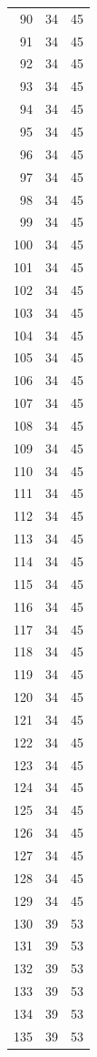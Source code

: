 \begin{table}
\begin{tabular}{rrr}
90 & 34 & 45 \\
91 & 34 & 45 \\
92 & 34 & 45 \\
93 & 34 & 45 \\
94 & 34 & 45 \\
95 & 34 & 45 \\
96 & 34 & 45 \\
97 & 34 & 45 \\
98 & 34 & 45 \\
99 & 34 & 45 \\
100 & 34 & 45 \\
101 & 34 & 45 \\
102 & 34 & 45 \\
103 & 34 & 45 \\
104 & 34 & 45 \\
105 & 34 & 45 \\
106 & 34 & 45 \\
107 & 34 & 45 \\
108 & 34 & 45 \\
109 & 34 & 45 \\
110 & 34 & 45 \\
111 & 34 & 45 \\
112 & 34 & 45 \\
113 & 34 & 45 \\
114 & 34 & 45 \\
115 & 34 & 45 \\
116 & 34 & 45 \\
117 & 34 & 45 \\
118 & 34 & 45 \\
119 & 34 & 45 \\
120 & 34 & 45 \\
121 & 34 & 45 \\
122 & 34 & 45 \\
123 & 34 & 45 \\
124 & 34 & 45 \\
125 & 34 & 45 \\
126 & 34 & 45 \\
127 & 34 & 45 \\
128 & 34 & 45 \\
129 & 34 & 45 \\
130 & 39 & 53 \\
131 & 39 & 53 \\
132 & 39 & 53 \\
133 & 39 & 53 \\
134 & 39 & 53 \\
135 & 39 & 53 \\

\end{tabular}
\end{table}
